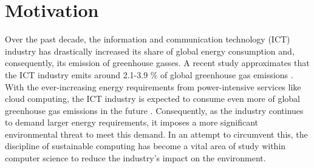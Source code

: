 \documentclass{l4proj}
\begin{document}




\section{Motivation}\label{intro:subsec:motivation}
\citep{en12010184}
Over the past decade, the information and communication technology (ICT) industry has drastically increased its share of global energy consumption and, consequently, its emission of greenhouse gasses.
A recent study approximates that the ICT industry emits around 2.1-3.9 \% of global greenhouse gas emissions \citep{current_energy_consumption}.
With the ever-increasing energy requirements from power-intensive services like cloud computing, the ICT industry is expected to consume even more of global greenhouse gas emissions in the future \citep{co2Challenges}.
Consequently, as the industry continues to demand larger energy requirements, it imposes a more significant environmental threat to meet this demand.
In an attempt to circumvent this, the discipline of sustainable computing has become a vital area of study within computer science to reduce the industry's impact on the environment.
\end{document}
